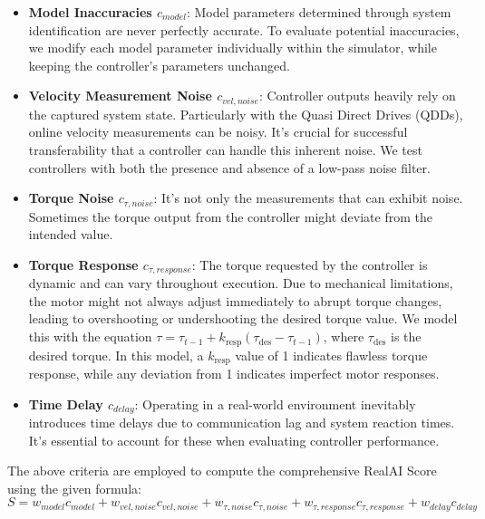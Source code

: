 \begin{itemize}
    \item \textbf{Model Inaccuracies \(c_{model}\)}: Model parameters determined through system identification are never perfectly accurate. To evaluate potential inaccuracies, we modify each model parameter individually within the simulator, while keeping the controller's parameters unchanged.

    \item \textbf{Velocity Measurement Noise \(c_{vel, noise}\)}: Controller outputs heavily rely on the captured system state. Particularly with the Quasi Direct Drives (QDDs), online velocity measurements can be noisy. It's crucial for successful transferability that a controller can handle this inherent noise. We test controllers with both the presence and absence of a low-pass noise filter.

    \item \textbf{Torque Noise \(c_{\tau,noise}\)}: It's not only the measurements that can exhibit noise. Sometimes the torque output from the controller might deviate from the intended value.

    \item \textbf{Torque Response \(c_{\tau,response}\)}: The torque requested by the controller is dynamic and can vary throughout execution. Due to mechanical limitations, the motor might not always adjust immediately to abrupt torque changes, leading to overshooting or undershooting the desired torque value. We model this with the equation \(\tau = \tau_{t-1} + k_{\text{resp}} (\tau_{\text{des}} - \tau_{t-1})\), where \(\tau_{\text{des}}\) is the desired torque. In this model, a \(k_{\text{resp}}\) value of 1 indicates flawless torque response, while any deviation from 1 indicates imperfect motor responses.

    \item \textbf{Time Delay \(c_{delay}\)}: Operating in a real-world environment inevitably introduces time delays due to communication lag and system reaction times. It's essential to account for these when evaluating controller performance.
\end{itemize}

The above criteria are employed to compute the comprehensive RealAI Score using the given formula:
\begin{equation}
 S = w_{model} c_{model} + 
    w_{vel, noise} c_{vel, noise} +  
    w_{\tau, noise} c_{\tau, noise} +  
    w_{\tau, response} c_{\tau, response} +  
    w_{delay} c_{delay}
\end{equation}

